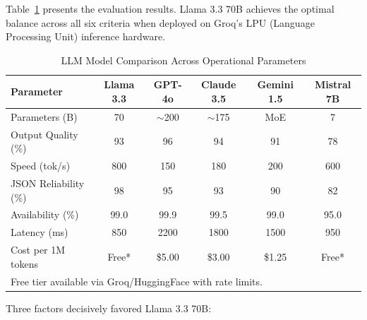 Table~\ref{tab:model_comparison} presents the evaluation results. Llama 3.3 70B achieves the optimal balance across all six criteria when deployed on Groq's LPU (Language Processing Unit) inference hardware.

\begin{table}[htbp]
\centering
\caption{LLM Model Comparison Across Operational Parameters}
\label{tab:model_comparison}
\begin{tabular}{lccccc}
\toprule
\textbf{Parameter} & \textbf{Llama 3.3} & \textbf{GPT-4o} & \textbf{Claude 3.5} & \textbf{Gemini 1.5} & \textbf{Mistral 7B} \\
\midrule
Parameters (B)       & 70    & $\sim$200 & $\sim$175 & MoE   & 7     \\
Output Quality (\%)  & 93    & 96        & 94        & 91    & 78    \\
Speed (tok/s)        & 800   & 150       & 180       & 200   & 600   \\
JSON Reliability (\%)& 98    & 95        & 93        & 90    & 82    \\
Availability (\%)    & 99.0  & 99.9      & 99.5      & 99.0  & 95.0  \\
Latency (ms)         & 850   & 2200      & 1800      & 1500  & 950   \\
Cost per 1M tokens   & Free* & \$5.00    & \$3.00    & \$1.25 & Free* \\
\bottomrule
\multicolumn{6}{l}{\footnotesize *Free tier available via Groq/HuggingFace with rate limits.}
\end{tabular}
\end{table}

Three factors decisively favored Llama 3.3 70B:

